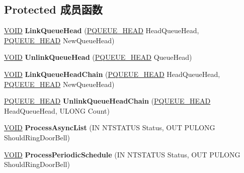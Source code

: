 \subsection*{Protected 成员函数}
\begin{DoxyCompactItemize}
\item 
\mbox{\label{class_c_u_s_b_queue_affa99b627dd587cc59873bb502d391bb}} 
\hyperlink{interfacevoid}{V\+O\+ID} {\bfseries Link\+Queue\+Head} (\hyperlink{struct___q_u_e_u_e___h_e_a_d}{P\+Q\+U\+E\+U\+E\+\_\+\+H\+E\+AD} Head\+Queue\+Head, \hyperlink{struct___q_u_e_u_e___h_e_a_d}{P\+Q\+U\+E\+U\+E\+\_\+\+H\+E\+AD} New\+Queue\+Head)
\item 
\mbox{\label{class_c_u_s_b_queue_a323813986b88f740dc9127046062d643}} 
\hyperlink{interfacevoid}{V\+O\+ID} {\bfseries Unlink\+Queue\+Head} (\hyperlink{struct___q_u_e_u_e___h_e_a_d}{P\+Q\+U\+E\+U\+E\+\_\+\+H\+E\+AD} Queue\+Head)
\item 
\mbox{\label{class_c_u_s_b_queue_a5ae2679d162a509fd39a7ffb64f3e953}} 
\hyperlink{interfacevoid}{V\+O\+ID} {\bfseries Link\+Queue\+Head\+Chain} (\hyperlink{struct___q_u_e_u_e___h_e_a_d}{P\+Q\+U\+E\+U\+E\+\_\+\+H\+E\+AD} Head\+Queue\+Head, \hyperlink{struct___q_u_e_u_e___h_e_a_d}{P\+Q\+U\+E\+U\+E\+\_\+\+H\+E\+AD} New\+Queue\+Head)
\item 
\mbox{\label{class_c_u_s_b_queue_a0925f765e301e754ee85b31e5bb60d66}} 
\hyperlink{struct___q_u_e_u_e___h_e_a_d}{P\+Q\+U\+E\+U\+E\+\_\+\+H\+E\+AD} {\bfseries Unlink\+Queue\+Head\+Chain} (\hyperlink{struct___q_u_e_u_e___h_e_a_d}{P\+Q\+U\+E\+U\+E\+\_\+\+H\+E\+AD} Head\+Queue\+Head, U\+L\+O\+NG Count)
\item 
\mbox{\label{class_c_u_s_b_queue_ae2667d9753e0d41ce05fefb12ff125b5}} 
\hyperlink{interfacevoid}{V\+O\+ID} {\bfseries Process\+Async\+List} (IN N\+T\+S\+T\+A\+T\+US Status, O\+UT P\+U\+L\+O\+NG Should\+Ring\+Door\+Bell)
\item 
\mbox{\label{class_c_u_s_b_queue_a48699c8870a4253196a95c212eba3c91}} 
\hyperlink{interfacevoid}{V\+O\+ID} {\bfseries Process\+Periodic\+Schedule} (IN N\+T\+S\+T\+A\+T\+US Status, O\+UT P\+U\+L\+O\+NG Should\+Ring\+Door\+Bell)
\item 

\end{DoxyCompactItemize}
